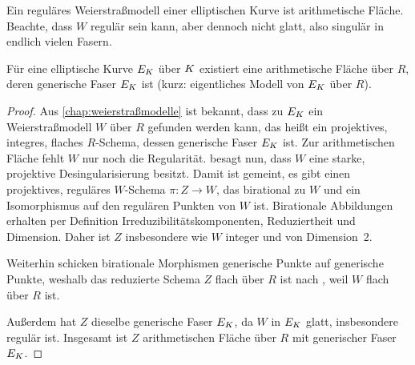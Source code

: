\begin{Beispiel}\label{bsp:regweierstraßmodell}
  Ein reguläres Weierstraßmodell einer elliptischen Kurve ist
  arithmetische Fläche.
  Beachte, dass $W$ regulär sein kann, aber dennoch nicht glatt, also
  singulär in endlich vielen Fasern.
\end{Beispiel}

\begin{Satz}\label{thm:exarithfl}
  Für eine elliptische Kurve $E_{K}$ über $K$ existiert eine
  arithmetische Fläche über $R$, deren generische Faser $E_{K}$ ist
  (kurz: eigentliches Modell von $E_{K}$ über $R$).
  \begin{proof}
    Aus \autoref{chap:weierstraßmodelle} ist bekannt, dass zu $E_{K}$
    ein Weierstraßmodell $W$ über $R$ gefunden werden kann, das heißt
    ein projektives, integres, flaches $R$-Schema, dessen generische
    Faser $E_{K}$ ist. Zur arithmetischen Fläche fehlt $W$ nur noch die
    Regularität.
    \cite[Corollary~8.3.51]{liu} besagt nun, dass $W$ eine starke,
    projektive Desingularisierung besitzt. Damit ist gemeint, es gibt
    einen projektives, reguläres $W$-Schema ${\pi\colon Z\to W}$, das
    birational zu $W$ und ein Isomorphismus auf den regulären Punkten
    von $W$ ist.
    Birationale Abbildungen erhalten per Definition
    Irreduzibilitätskomponenten, Reduziertheit und Dimension.
    Daher ist $Z$ insbesondere wie $W$ integer
    und von Dimension~2.

    Weiterhin schicken birationale Morphismen generische Punkte auf
    generische Punkte, weshalb das reduzierte Schema $Z$ flach über
    $R$ ist nach \cite[Proposition~III.9.7]{hartshorne}, weil
    $W$ flach über $R$ ist.

    Außerdem hat $Z$ dieselbe generische Faser $E_{K}$, da
    $W$ in $E_{K}$ glatt, insbesondere regulär ist.
    Insgesamt ist $Z$ arithmetischen Fläche über $R$ mit
    generischer Faser $E_{K}$.
  \end{proof}
\end{Satz}

